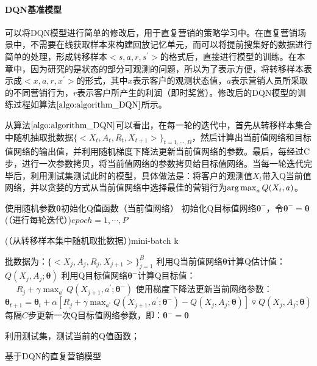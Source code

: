 \paragraph{DQN基准模型}
可以将DQN模型进行简单的修改后，用于直复营销的策略学习中。在直复营销场景中，不需要在线获取样本来构建回放记忆单元，而可以将提前搜集好的数据进行简单的处理，形成转移样本$<s, a, r, s^{'}>$的格式后，直接进行模型的训练。在本章中，因为研究的是状态的部分可观测的问题，所以为了表示方便，将转移样本表示成$<x, a, r, x
^{'}>$的形式，其中$x$表示客户的观测状态值，$a$表示营销人员所采取的不同营销行为，$r$表示客户所产生的利润（即时奖赏）。修改后的DQN模型的训练过程如算法$\ref{algo:algorithm_DQN}$所示。

从算法$\ref{algo:algorithm_DQN}$可以看出，在每一轮的迭代中，首先从转移样本集合中随机抽取批数据$\{<X_{t}, A_{t}, R_{t}, X_{t+1}>\}_{t=1,\cdots,B}$，然后计算出当前值网络和目标值网络的输出值，并利用随机梯度下降法更新当前值网络的参数。最后，每经过C步，进行一次参数拷贝，将当前值网络的参数拷贝给目标值网络。当每一轮迭代完毕后，利用测试集测试此时的模型，具体做法是：将客户的观测值$X_{t}$带入Q当前值网络，并以贪婪的方式从当前值网络中选择最佳的营销行为$\operatorname*{arg\,max}_{a}Q(X_{t},a)$。

\begin{algorithm}[htbp]
 \small
 \SetAlgoLined

 使用随机参数$\bm{\theta}$初始化Q值函数（当前值网络）\;
 初始化Q目标值网络$\bm{\theta}^{-}$，令$\bm{\theta}^{-}=\bm{\theta}$\;
 \For(（进行每轮迭代）){$epoch=1,\cdots, P$}{
  \For(（从转移样本集中随机取批数据）){mini-batch k}{

    批数据为：$\{<X_{j}, A_{j}, R_{j}, X_{j+1}>\}_{j=1}^{B}$\;
    利用Q当前值网络$\bm{\theta}$计算Q估计值：$Q(X_{j}, A_{j};\bm{\theta})$\;
    利用Q目标值网络$\bm{\theta}^{-}$计算Q目标值：\\
     $\quad$ $R_{j}+\gamma \max_{a^{'}}Q(X_{j+1},a^{'};\bm{\theta}^{-})$\;
    使用梯度下降法更新当前网络参数：
    $\bm{\theta}_{t+1}=\bm{\theta}_{t}+\alpha[R_{j}+\gamma \max_{a^{'}}Q(X_{j+1},a^{'};\bm{\theta}^{-})-Q(X_{j}, A_{j};\bm{\theta})]\triangledown Q(X_{j}, A_{j};\bm{\theta})$\;
    每隔$C$步更新一次Q目标值网络参数，即：$\bm{\theta}^{-}=\bm{\theta}$\;
    }
    利用测试集，测试当前的Q值函数；
 }
 \caption{基于DQN的直复营销模型}
 \label{algo:algorithm_DQN}
 \end{algorithm}

